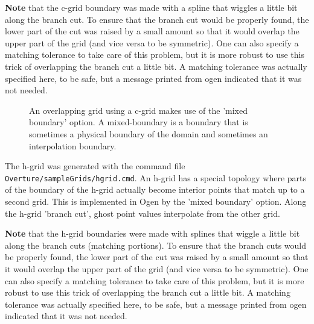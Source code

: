 \documentclass[xcolor=rgb,svgnames,dvipsnames]{article}
\newcommand{\figures}{\homeHenshaw/OvertureFigures}
\begin{document}
{\bf Note} that the c-grid boundary was made with a spline that wiggles a
little bit along the branch cut. To ensure that the branch cut would be
properly found, the lower part of the cut was raised by a small amount
so that it would overlap the upper part of the grid (and vice versa to be
symmetric). One can also specify a matching tolerance to take care of this problem,
but it is more robust to use this trick of overlapping the branch cut a little bit.
A matching tolerance was actually specified here, to be safe, but a message printed
from ogen indicated that it was not needed. 
% 
{
\newcommand{\figWidthd}{11cm}
\newcommand{\trimfig}[2]{\trimPlot{#1}{#2}{.0}{.0}{.25}{.25}}
\begin{figure}[hbt]
\begin{center}
\end{center}
  \caption{An overlapping grid using a c-grid makes use of the 'mixed boundary' option.
         A mixed-boundary is a boundary that is sometimes a physical boundary of the
     domain and sometimes an interpolation boundary.}  \label{fig:cgrid}
\end{figure}
}
The h-grid was generated with the command file {\tt Overture/sampleGrids/hgrid.cmd}.
An h-grid has a special topology where parts of the boundary of the h-grid
actually become interior points that match up to a second grid.
This is implemented in Ogen by the 'mixed boundary' option. Along the
h-grid 'branch cut', ghost point values interpolate from the other grid.

{\bf Note} that the h-grid boundaries were made with splines that wiggle a
little bit along the branch cuts (matching portions). To ensure that the branch cuts would be
properly found, the lower part of the cut was raised by a small amount
so that it would overlap the upper part of the grid (and vice versa to be
symmetric). One can also specify a matching tolerance to take care of this problem,
but it is more robust to use this trick of overlapping the branch cut a little bit.
A matching tolerance was actually specified here, to be safe, but a message printed
from ogen indicated that it was not needed. 
\end{document}
